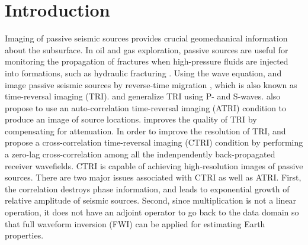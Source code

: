 \section{Introduction}
Imaging of passive seismic sources provides crucial geomechanical information about the subsurface. In oil and gas exploration, passive sources are useful for monitoring the propagation of fractures when high-pressure fluids are injected into formations, such as hydraulic fracturing \cite[]{montgomery10,maxwellbook}. 
Using the wave equation, \cite{gajewski05} and \cite{fink2006time} image passive seismic sources by reverse-time migration \cite[]{mcmechan82}, which is also known as time-reversal imaging (TRI). \cite{atm10} and \cite{witten11} generalize TRI using P- and S-waves. \cite{atm10} also propose to use an auto-correlation time-reversal imaging (ATRI) condition to produce an image of source locations. \cite{zhu2014time} improves the quality of TRI by compensating for attenuation. In order to improve the resolution of TRI, \cite{meabs15a} and \cite{nakata16} propose a cross-correlation time-reversal imaging (CTRI) condition by performing a zero-lag cross-correlation among all the indenpendently back-propagated receiver wavefields. CTRI is capable of achieving high-resolution images of passive sources. There are two major issues associated with CTRI as well as ATRI. First, the correlation destroys phase information, and leads to exponential growth of relative amplitude of seismic sources. Second, since multiplication is not a linear operation, it does not have an adjoint operator to go back to the data domain so that full waveform inversion (FWI) can be applied for estimating Earth properties.

